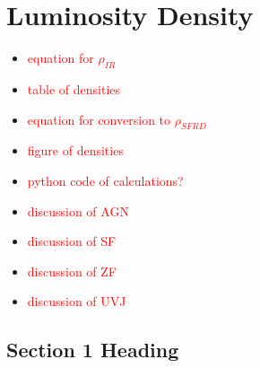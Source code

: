 \chapter{Luminosity Density}
\thispagestyle{empty}

\begin{itemize}
    \item \textcolor{red}{equation for $\rho_{IR}$}
    \item \textcolor{red}{table of densities}
    \item \textcolor{red}{equation for conversion to $\rho_{SFRD}$}
    \item \textcolor{red}{figure of densities}
    \item \textcolor{red}{python code of calculations?}
    \item \textcolor{red}{discussion of AGN}
    \item \textcolor{red}{discussion of SF}
    \item \textcolor{red}{discussion of ZF}
    \item \textcolor{red}{discussion of UVJ}
\end{itemize}

\section{Section 1 Heading}

\lipsum[1]